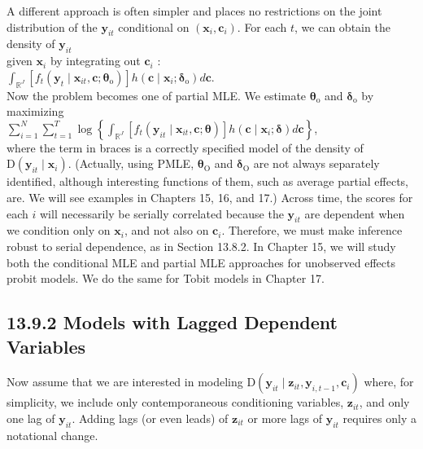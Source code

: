 \documentclass[10pt]{article}
\begin{document}
A different approach is often simpler and places no restrictions on the joint distribution of the $\mathbf{y}_{i t}$ conditional on $\left(\mathbf{x}_{i}, \mathbf{c}_{i}\right)$. For each $t$, we can obtain the density of $\mathbf{y}_{i t}$\\
given $\mathbf{x}_{i}$ by integrating out $\mathbf{c}_{i}$ :\\
$\int_{\mathbb{R}^{J}}\left[f_{t}\left(\mathbf{y}_{t} \mid \mathbf{x}_{i t}, \mathbf{c} ; \boldsymbol{\theta}_{\mathrm{o}}\right)\right] h\left(\mathbf{c} \mid \mathbf{x}_{i} ; \boldsymbol{\delta}_{\mathrm{o}}\right) d \mathbf{c}$.\\
Now the problem becomes one of partial MLE. We estimate $\boldsymbol{\theta}_{\mathrm{o}}$ and $\boldsymbol{\delta}_{\mathrm{o}}$ by maximizing\\
$\sum_{i=1}^{N} \sum_{t=1}^{T} \log \left\{\int_{\mathbb{R}^{J}}\left[f_{t}\left(\mathbf{y}_{i t} \mid \mathbf{x}_{i t}, \mathbf{c} ; \boldsymbol{\theta}\right)\right] h\left(\mathbf{c} \mid \mathbf{x}_{i} ; \boldsymbol{\delta}\right) d \mathbf{c}\right\}$,\\
where the term in braces is a correctly specified model of the density of $\mathrm{D}\left(\mathbf{y}_{i t} \mid \mathbf{x}_{i}\right)$. (Actually, using PMLE, $\boldsymbol{\theta}_{\mathrm{O}}$ and $\boldsymbol{\delta}_{\mathrm{O}}$ are not always separately identified, although interesting functions of them, such as average partial effects, are. We will see examples in Chapters 15, 16, and 17.) Across time, the scores for each $i$ will necessarily be serially correlated because the $\mathbf{y}_{i t}$ are dependent when we condition only on $\mathbf{x}_{i}$, and not also on $\mathbf{c}_{i}$. Therefore, we must make inference robust to serial dependence, as in Section 13.8.2. In Chapter 15, we will study both the conditional MLE and partial MLE approaches for unobserved effects probit models. We do the same for Tobit models in Chapter 17.

\subsection*{13.9.2 Models with Lagged Dependent Variables}
Now assume that we are interested in modeling $\mathrm{D}\left(\mathbf{y}_{i t} \mid \mathbf{z}_{i t}, \mathbf{y}_{i, t-1}, \mathbf{c}_{i}\right)$ where, for simplicity, we include only contemporaneous conditioning variables, $\mathbf{z}_{i t}$, and only one lag of $\mathbf{y}_{i t}$. Adding lags (or even leads) of $\mathbf{z}_{i t}$ or more lags of $\mathbf{y}_{i t}$ requires only a notational change.
\end{document}
